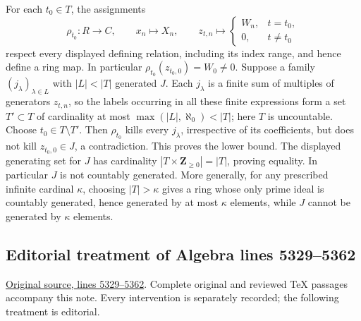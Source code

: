\begin{remark}
\medskip\noindent
For each $t_0\in T$, the assignments
$$
\rho_{t_0}:R\longrightarrow C,\qquad
x_n\longmapsto X_n,\qquad
z_{t,n}\longmapsto
\begin{cases}W_n,&t=t_0,\\0,&t\ne t_0\end{cases}
$$
respect every displayed defining relation, including its index range,
and hence define a ring map. In particular
$\rho_{t_0}(z_{t_0,0})=W_0\ne0$.
Suppose a family $(j_\lambda)_{\lambda\in L}$ with $|L|<|T|$
generated $J$. Each $j_\lambda$ is a finite sum of multiples
of generators $z_{t,n}$, so the labels occurring in all these
finite expressions form a set $T'\subset T$ of cardinality at most
$\max(|L|,\aleph_0)<|T|$; here $T$ is uncountable.
Choose $t_0\in T\setminus T'$. Then $\rho_{t_0}$ kills every
$j_\lambda$, irrespective of its coefficients, but does not kill
$z_{t_0,0}\in J$, a contradiction.
This proves the lower bound. The displayed generating set for $J$
has cardinality $|T\times\mathbf Z_{\geq0}|=|T|$, proving equality.
In particular $J$ is not countably generated.
More generally, for any prescribed infinite cardinal $\kappa$, choosing
$|T|>\kappa$ gives a ring whose only prime ideal is countably
generated, hence generated by at most $\kappa$ elements, while $J$
cannot be generated by $\kappa$ elements.
\end{remark}


\subsection{Editorial treatment of Algebra lines 5329--5362}

\hypertarget{algebra-context-033}{}

\noindent\href{https://github.com/stacks/stacks-project/blob/a04446e57ec1fbc252a871afcec7752fb2807b14/algebra.tex\#L5329}{Original source, lines 5329--5362}. Complete original and reviewed TeX passages accompany this note. Every intervention is separately recorded; the following treatment is editorial.



